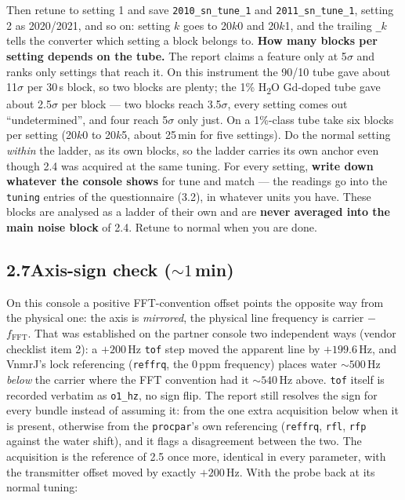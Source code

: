 \documentclass[11pt]{article}
\newcommand{\htwo}{H\textsubscript{2}O}
\newcommand{\file}[1]{\texttt{#1}}
\begin{document}
Then retune to setting 1 and save \texttt{2010\_sn\_tune\_1} and
\texttt{2011\_sn\_tune\_1}, setting 2 as 2020/2021, and so on: setting
$k$ goes to 20$k$0 and 20$k$1, and the trailing \texttt{\_}$k$ tells
the converter which setting a block belongs to. \textbf{How many blocks
per setting depends on the tube.} The report claims a feature only at
5$\sigma$ and ranks only settings that reach it. On this instrument
the 90/10 tube gave about 11$\sigma$ per 30\,s block, so two blocks
are plenty; the 1\% \htwo{} Gd-doped tube gave about 2.5$\sigma$ per
block --- two blocks reach 3.5$\sigma$, every setting comes out
``undetermined'', and four reach 5$\sigma$ only just. On a 1\%-class
tube take six blocks per setting (20$k$0 to 20$k$5, about 25\,min for
five settings). Do the normal setting
\emph{within} the ladder, as its own blocks, so the ladder carries
its own anchor even though 2.4 was acquired at the same tuning. For
every setting, \textbf{write down whatever the console shows} for tune
and match --- the readings go into the \texttt{tuning} entries of the
questionnaire (3.2), in whatever units you have. These blocks are
analysed as a ladder of their own and are \textbf{never averaged into
the main noise block} of 2.4. Retune to normal when you are done.

\subsection*{2.7\quad Axis-sign check (${\sim}1$\,min)}

On this console a positive FFT-convention offset points the opposite
way from the physical one: the axis is \emph{mirrored}, the physical
line frequency is carrier $-$ $f_{\mathrm{FFT}}$. That was established
on the partner console two independent ways (vendor checklist item 2):
a $+200$\,Hz \texttt{tof} step moved the apparent line by $+199.6$\,Hz,
and VnmrJ's lock referencing (\texttt{reffrq}, the 0\,ppm frequency)
places water ${\sim}500$\,Hz \emph{below} the carrier where the FFT
convention had it ${\sim}540$\,Hz above. \texttt{tof} itself is
recorded verbatim as \texttt{o1\_hz}, no sign flip. The report still
resolves the sign for every bundle instead of assuming it: from the
one extra acquisition below when it is present, otherwise from the
\file{procpar}'s own referencing (\texttt{reffrq}, \texttt{rfl},
\texttt{rfp} against the water shift), and it flags a disagreement
between the two. The acquisition is the reference of 2.5 once more,
identical in every parameter, with the transmitter offset moved by
exactly $+200$\,Hz. With the probe back at its normal tuning:
\end{document}
